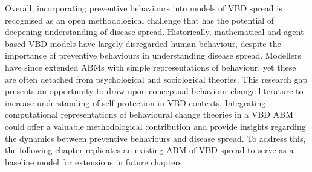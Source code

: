 Overall, incorporating preventive behaviours into models of VBD spread is recognised as an open methodological challenge that has the potential of deepening understanding of disease spread. Historically, mathematical and agent-based VBD models have largely disregarded human behaviour, despite the importance of preventive behaviours in understanding disease spread. Modellers have since extended ABMs with simple representations of behaviour, yet these are often detached from psychological and sociological theories. This research gap presents an opportunity to draw upon conceptual behaviour change literature to increase understanding of self-protection in VBD contexts. Integrating computational representations of behavioural change theories in a VBD ABM could offer a valuable methodological contribution and provide insights regarding the dynamics between preventive behaviours and disease spread. To address this, the following chapter replicates an existing ABM of VBD spread to serve as a baseline model for extensions in future chapters.






